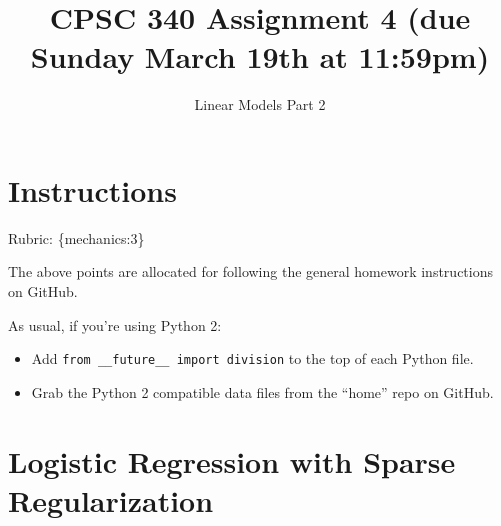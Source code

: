 \documentclass{article}
\begin{document}
\def\blu#1{{\color{blu}#1}}
\def\gre#1{{\color{gre}#1}}
\def\red#1{{\color{red}#1}}
\def\norm#1{\|#1\|}
\newcommand{\argmin}[1]{\mathop{\hbox{argmin}}_{#1}}
\newcommand{\argmax}[1]{\mathop{\hbox{argmax}}_{#1}}
\def\R{\mathbb{R}}
\newcommand{\fig}[2]{\texttt{[image: \#2]}}
\newcommand{\centerfig}[2]{\begin{center}\texttt{[image: \#2]}\end{center}}
\def\items#1{\begin{itemize}#1\end{itemize}}
\def\enum#1{\begin{enumerate}#1\end{enumerate}}
\newcommand{\half}{\frac 1 2}
\def\argmax{\mathop{\rm arg\,max}}
\def\argmin{\mathop{\rm arg\,min}}
\def\rubric#1{\gre{Rubric: \{#1\}}}{}


\title{CPSC 340 Assignment 4 (due Sunday March 19th at 11:59pm)}
\author{Linear Models Part 2}
\date{}
\maketitle


\section*{Instructions}
\rubric{mechanics:3}

The above points are allocated for following the general homework instructions on GitHub.

As usual, if you're using Python 2:
\begin{itemize}
  \item Add \verb|from __future__ import division| to the top of each Python file. 
  \item Grab the Python 2 compatible data files from the ``home'' repo on GitHub.
\end{itemize}



\section{Logistic Regression with Sparse Regularization}
\end{document}
